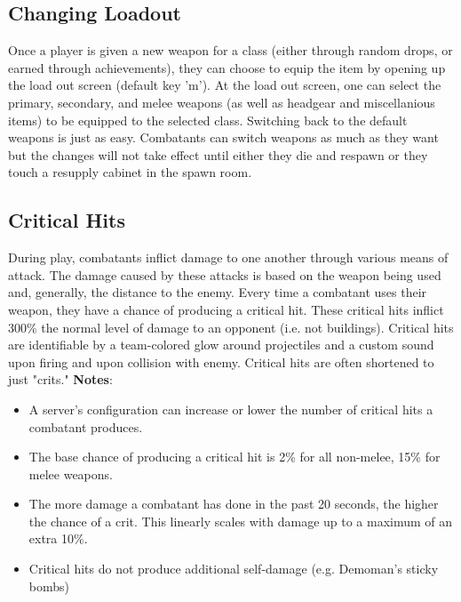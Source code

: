 \subsection{Changing Loadout}
Once a player is given a new weapon for a class (either through random drops, or earned through achievements), they can choose to equip the item by opening up the load out screen (default key 'm'). At the load out screen, one can select the primary, secondary, and melee weapons (as well as headgear and miscellanious items) to be equipped to the selected class.  Switching back to the default weapons is just as easy. Combatants can switch weapons as much as they want but the changes will not take effect until either they die and respawn or they touch a resupply cabinet in the spawn room.

\subsection{Critical Hits}
During play, combatants inflict damage to one another through various means of attack.  The damage caused by these attacks is based on the weapon being used and, generally, the distance to the enemy.  Every time a combatant uses their weapon, they have a chance of producing a critical hit.  These critical hits inflict 300\% the normal level of damage to an opponent (i.e. not buildings). Critical hits are identifiable by a team-colored glow around projectiles and a custom sound upon firing and upon collision with enemy.  Critical hits are often shortened to just "crits."
\newpage
{\bf Notes}:
\begin{itemize}
	\item A server's configuration can increase or lower the number of critical hits a combatant produces. 
	\item The base chance of producing a critical hit is 2\% for all non-melee, 15\% for melee weapons.
	\item The more damage a combatant has done in the past 20 seconds, the higher the chance of a crit. This linearly scales with damage up to a maximum of an extra 10\%. 
	\item Critical hits do not produce additional self-damage (e.g. Demoman's sticky bombs)
\end{itemize}

